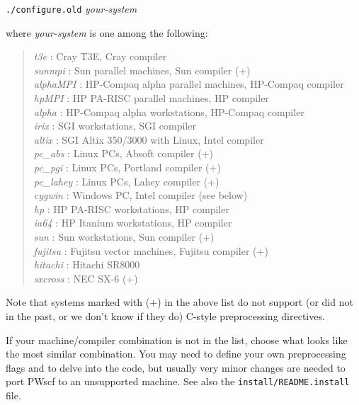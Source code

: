 \documentclass[12pt]{article}
\begin{document}
{\tt ./configure.old} {\em your-system}

\noindent where {\em your-system} is one among the following:
\begin{quote}
{\em t3e       }: Cray T3E, Cray compiler\\
{\em sunmpi    }: Sun parallel machines, Sun compiler (+)\\
{\em alphaMPI  }: HP-Compaq alpha parallel machines, HP-Compaq compiler\\
{\em hpMPI     }: HP PA-RISC parallel machines, HP compiler\\
{\em alpha     }: HP-Compaq alpha workstations, HP-Compaq compiler\\
{\em irix      }: SGI workstations, SGI compiler\\
{\em altix     }: SGI Altix 350/3000 with Linux, Intel compiler\\
{\em pc\_abs   }: Linux PCs, Absoft compiler (+)\\
{\em pc\_pgi   }: Linux PCs, Portland compiler (+)\\
{\em pc\_lahey }: Linux PCs, Lahey compiler (+)\\
{\em cygwin    }: Windows PC, Intel compiler (see below)\\
{\em hp        }: HP PA-RISC workstations, HP compiler\\
{\em ia64      }: HP Itanium workstations, HP compiler\\
{\em sun       }: Sun workstations, Sun compiler (+)\\
{\em fujitsu   }: Fujitsu vector machines, Fujitsu compiler (+)\\
{\em hitachi   }: Hitachi SR8000 \\
{\em sxcross   }: NEC SX-6 (+)
\end{quote}

Note that systems marked with (+) in the above list do not support (or
did not in the past, or we don't know if they do) C-style preprocessing
directives.

If your machine/compiler combination is not in the list, choose what
looks like the most similar combination.  You may need to define your
own preprocessing flags and to delve into the code, but usually very
minor changes are needed to port PWscf to an unsupported machine.
See also the {\tt install/README.install} file.

\end{document}
